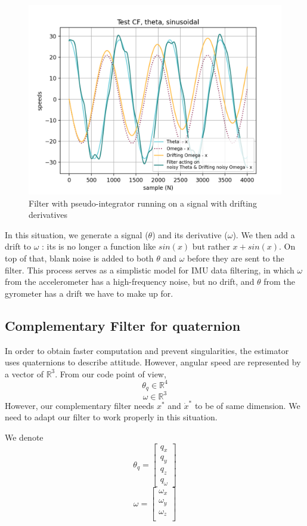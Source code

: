 \documentclass[a4paper,10pt]{article}
\begin{document}
\begin{figure}[H]
\label{fig:complementary_filter_run_drift}
\centering
  \includegraphics[width=\linewidth, angle=0, scale=0.8]{./images/CF_Drifting_Signal.png}
  \caption{Filter with pseudo-integrator running on a signal with drifting derivatives}
\end{figure}
In this situation, we generate a signal ($\theta$) and its derivative ($\omega$). We then add a drift to $\omega$ : its is no longer a function like $sin(x)$ but rather $x + sin(x)$. On top of that, blank noise is added to both $\theta$ and $\omega$ before they are sent to the filter. This process serves as a simplistic model for IMU data filtering, in which $\omega$ from the accelerometer has a high-frequency noise, but no drift, and $\theta$ from the gyrometer has a drift we have to make up for.


\subsection{Complementary Filter for quaternion}
\label{complementary filter quaternion}
In order to obtain faster computation and prevent singularities, the estimator uses quaternions \cite{quaternion_Yan-Bin_Jia} to describe attitude. However, angular speed are represented by a vector of $\mathbb{R}^3$. From our code point of view,
$$\theta_q \in\mathbb{R}^4$$
$$\omega \in\mathbb{R}^3$$
However, our complementary filter needs $x^*$ and $ \dot x^*$ to be of same dimension. We need to adapt our filter to work properly in this situation.

\medskip
We denote
$$\theta_q = \begin{bmatrix}  q_x\\ q_y\\ q_z\\  q_{\omega}      \end{bmatrix}$$
$$\omega = \begin{bmatrix}  \omega_x\\ \omega_y\\ \omega_z\\    \end{bmatrix}$$
\end{document}
